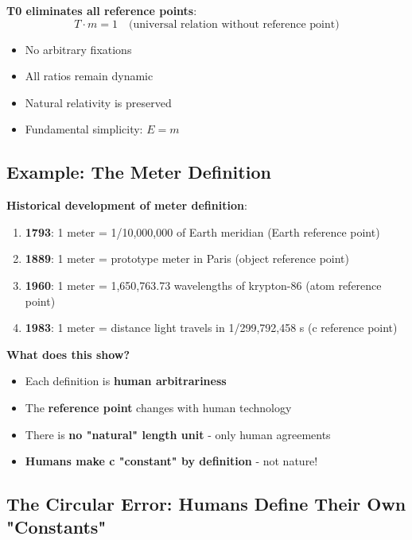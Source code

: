 \documentclass[12pt,a4paper]{article}
\newcommand{\Tfield}{T}
\begin{document}
	\textbf{T0 eliminates all reference points}:
	\begin{equation}
		\Tfield \cdot m = 1 \quad \text{(universal relation without reference point)}
	\end{equation}
	
	\begin{itemize}
		\item No arbitrary fixations
		\item All ratios remain dynamic
		\item Natural relativity is preserved
		\item Fundamental simplicity: $E = m$
	\end{itemize}
	
	\subsection{Example: The Meter Definition}
	
	\textbf{Historical development of meter definition}:
	\begin{enumerate}
		\item \textbf{1793}: 1 meter = 1/10,000,000 of Earth meridian (Earth reference point)
		\item \textbf{1889}: 1 meter = prototype meter in Paris (object reference point)  
		\item \textbf{1960}: 1 meter = 1,650,763.73 wavelengths of krypton-86 (atom reference point)
		\item \textbf{1983}: 1 meter = distance light travels in 1/299,792,458 s (c reference point)
	\end{enumerate}
	
	\textbf{What does this show?}
	\begin{itemize}
		\item Each definition is \textbf{human arbitrariness}
		\item The \textbf{reference point} changes with human technology
		\item There is \textbf{no "natural" length unit} - only human agreements
		\item \textbf{Humans make c "constant" by definition} - not nature!
	\end{itemize}
	
	\subsection{The Circular Error: Humans Define Their Own "Constants"}
	
\end{document}
